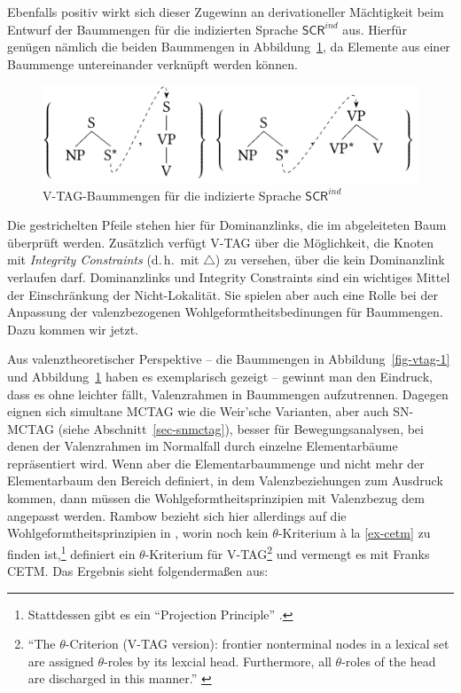 Ebenfalls positiv wirkt sich dieser Zugewinn an derivationeller Mächtigkeit beim Entwurf der Baummengen für die indizierten Sprache $\mathsf{SCR}^{ind}$ aus. Hierfür genügen nämlich die beiden Baummengen in Abbildung~\ref{fig-vtag-2}, da Elemente aus einer Baummenge untereinander verknüpft werden können.  
\begin{figure}[t]
\centering
\includegraphics{graphics/abb67.pdf}
\caption{V-TAG-Baummengen für die indizierte Sprache $\mathsf{SCR}^{ind}$\label{fig-vtag-2}}
\end{figure}
Die gestrichelten Pfeile stehen hier für Dominanzlinks, die im abgeleiteten Baum überprüft werden. Zusätzlich verfügt V-TAG über die Möglichkeit, die Knoten mit {\it Integrity Constraints} (d.\,h.\ mit $\bigtriangleup$) zu versehen, über die kein Dominanzlink verlaufen darf. Dominanzlinks und Integrity Constraints sind ein wichtiges Mittel der Einschränkung der Nicht-Lokalität. Sie spielen aber auch eine Rolle bei der Anpassung der valenzbezogenen Wohlgeformtheitsbedinungen für Baummengen. Dazu kommen wir jetzt. 

Aus valenztheoretischer Perspektive -- die Baummengen in Abbildung~\ref{fig-vtag-1} und Abbildung~\ref{fig-vtag-2} haben es exemplarisch gezeigt -- gewinnt man den Eindruck, dass es ohne  leichter fällt, Valenzrahmen in Baummengen aufzutrennen. Dagegen eignen sich simultane MCTAG wie die Weir'sche Varianten, aber auch SN-MCTAG (siehe Abschnitt~\ref{sec-snmctag}), besser für Bewegungsanalysen, bei denen der Valenzrahmen im Normalfall durch einzelne Elementarbäume repräsentiert wird. Wenn aber die Elementarbaummenge und nicht mehr der Elementarbaum den Bereich definiert, in dem Valenzbeziehungen zum Ausdruck kommen, dann müssen die Wohlgeformtheitsprinzipien mit Valenzbezug dem angepasst werden. Rambow bezieht sich hier allerdings auf die Wohlgeformtheitsprinzipien in \cite{Frank:92}, worin noch kein $\theta$-Kriterium \`a la \ref{ex-cetm} zu finden ist,\footnote{Stattdessen gibt es ein "`Projection Principle"' \cite[56]{Frank:92}.} definiert ein $\theta$-Kriterium für V-TAG\footnote{"`The $\theta$-Criterion (V-TAG version): frontier nonterminal nodes in a lexical set are assigned $\theta$-roles by its lexcial head. Furthermore, all $\theta$-roles of the head are discharged in this manner."' \citep[148]{Rambow:94}} und vermengt es mit Franks CETM. Das Ergebnis sieht folgenderma\ss en aus:
    
